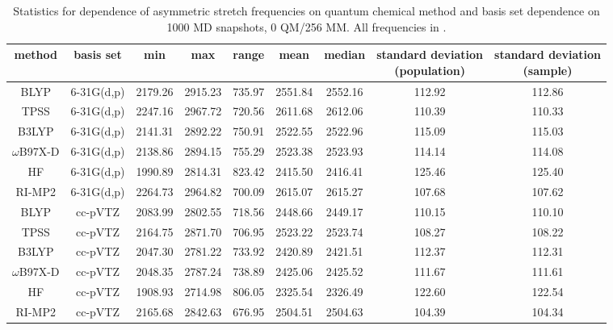 \documentclass[%
  class = book,%
  crop = false,%
  float = true,%
  multi = true,%
  preview = false,%
]{standalone}
\begin{document}
\begin{landscape}
  \begin{table}
    \centering
    \caption[Statistical distribution of harmonic frequencies for MD snapshots]{Statistics for dependence of  asymmetric stretch frequencies on quantum chemical method and basis set dependence on \num{1000} MD snapshots, 0 QM/256 MM. All frequencies in \si{\wavenumber}.}
    \label{paper_02:tab:S1}
    \begin{tabular}{ccccccccc}
      \toprule
      method & basis set & min & max & range & mean & median & \thead{standard deviation \\ (population)} & \thead{standard deviation \\ (sample)} \\
      \midrule
      BLYP & 6-31G(d,p) & 2179.26 & 2915.23 & 735.97 & 2551.84 & 2552.16 & 112.92 & 112.86 \\
      TPSS & 6-31G(d,p) & 2247.16 & 2967.72 & 720.56 & 2611.68 & 2612.06 & 110.39 & 110.33 \\
      B3LYP & 6-31G(d,p) & 2141.31 & 2892.22 & 750.91 & 2522.55 & 2522.96 & 115.09 & 115.03 \\
      \(\omega\)B97X-D & 6-31G(d,p) & 2138.86 & 2894.15 & 755.29 & 2523.38 & 2523.93 & 114.14 & 114.08 \\
      HF & 6-31G(d,p) & 1990.89 & 2814.31 & 823.42 & 2415.50 & 2416.41 & 125.46 & 125.40 \\
      RI-MP2 & 6-31G(d,p) & 2264.73 & 2964.82 & 700.09 & 2615.07 & 2615.27 & 107.68 & 107.62 \\
      BLYP & cc-pVTZ & 2083.99 & 2802.55 & 718.56 & 2448.66 & 2449.17 & 110.15 & 110.10 \\
      TPSS & cc-pVTZ & 2164.75 & 2871.70 & 706.95 & 2523.22 & 2523.74 & 108.27 & 108.22 \\
      B3LYP & cc-pVTZ & 2047.30 & 2781.22 & 733.92 & 2420.89 & 2421.51 & 112.37 & 112.31 \\
      \(\omega\)B97X-D & cc-pVTZ & 2048.35 & 2787.24 & 738.89 & 2425.06 & 2425.52 & 111.67 & 111.61 \\
      HF & cc-pVTZ & 1908.93 & 2714.98 & 806.05 & 2325.54 & 2326.49 & 122.60 & 122.54 \\
      RI-MP2 & cc-pVTZ & 2165.68 & 2842.63 & 676.95 & 2504.51 & 2504.63 & 104.39 & 104.34 \\
      \bottomrule
    \end{tabular}
  \end{table}
\end{landscape}
\end{document}
